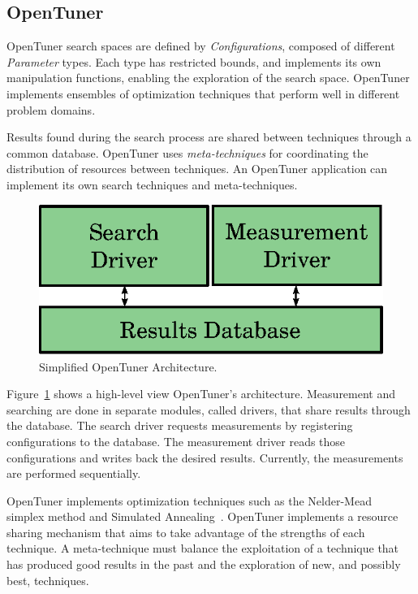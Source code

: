 \documentclass[a4paper, 12pt]{article}
\begin{document}
\subsection{OpenTuner} \label{sec:opt}

OpenTuner search spaces are defined by \emph{Configurations}, composed of
different \emph{Parameter} types. Each type has restricted bounds, and
implements its own manipulation functions, enabling the exploration of the
search space.  OpenTuner implements ensembles of optimization
techniques that perform well in different problem domains.

Results found during the search process are shared between techniques through a
common database. OpenTuner uses \emph{meta-techniques} for coordinating
the distribution of resources between techniques. An OpenTuner
application can implement its own search techniques and meta-techniques.

\begin{figure}[htpb]
    \centering
    \includegraphics[scale=.75]{opentuner-implementation}
    \caption{Simplified OpenTuner Architecture.}
    \label{fig:ot-imp}
\end{figure}

Figure~\ref{fig:ot-imp} shows a high-level view OpenTuner's architecture.
Measurement and searching are done in separate modules, called drivers, 
that share results through the database. The search driver requests 
measurements by registering configurations to the database. The measurement 
driver reads those configurations and writes back the desired results. 
Currently, the measurements are performed sequentially.

OpenTuner implements optimization techniques such as the
Nelder-Mead~\cite{nelder1965simplex} simplex
method and Simulated Annealing~\cite{kirkpatrick1983optimization}.
OpenTuner implements a resource sharing mechanism that aims to take
advantage of the strengths of each technique. A meta-technique
must balance the exploitation of a technique that has produced
good results in the past and the exploration of new, and possibly
best, techniques.
\end{document}

